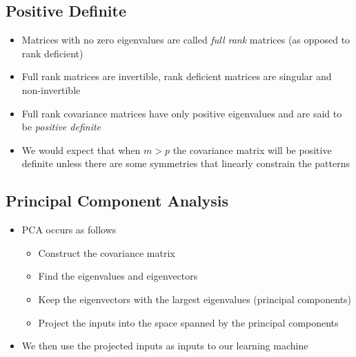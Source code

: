 
\begin{slide}
\section{Positive Definite}

\begin{PauseHighLight}

\begin{itemize}
\item Matrices with no zero eigenvalues are called \emph{full rank}
  matrices (as opposed to rank deficient)\pause
\item Full rank matrices are invertible, rank deficient matrices are
  singular and non-invertible\pause
\item Full rank covariance matrices have only positive eigenvalues and are
  said to be \emph{positive definite}\pause
\item We would expect that when $m>p$ the covariance matrix will be
  positive definite\pause{} unless there are some symmetries that linearly constrain the
  patterns\pauseb
\end{itemize}

\end{PauseHighLight}
\end{slide}

\Outline %

\begin{slide}
\section{Principal Component Analysis}

\begin{PauseHighLight}

\begin{itemize}\squeeze
\item PCA occurs as follows\pause
  \begin{itemize}
  \item Construct the covariance matrix\pause
  \item Find the eigenvalues and eigenvectors\pause
  \item Keep the eigenvectors with the largest eigenvalues (principal
    components)\pause
  \item Project the inputs into the space spanned by the principal
    components \pause
  \end{itemize}
\item  We then use the projected inputs as inputs to our learning
  machine\pause
\end{itemize}

\end{PauseHighLight}
\end{slide}

